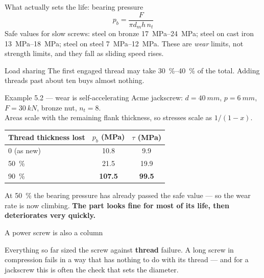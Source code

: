 \documentclass[aspectratio=169,10pt]{beamer}
\begin{document}
\begin{frame}{What actually sets the life: bearing pressure}
\[\boxed{\ p_b = \frac{F}{\pi d_m h\, n_t}\ }\]
\vfill
Safe values for slow screws: steel on bronze \SIrange{17}{24}{MPa}; steel on cast iron
\SIrange{13}{18}{MPa}; steel on steel \SIrange{7}{12}{MPa}.
\vfill
\alert{These are \emph{wear} limits, not strength limits}, and they fall as sliding speed rises.
\vfill
\begin{alertblock}{Load sharing}
The first engaged thread may take \SIrange{30}{40}{\percent} of the total. Adding threads past about
ten buys almost nothing.
\end{alertblock}
\end{frame}

\begin{frame}{Example 5.2 --- wear is self-accelerating}
Acme jackscrew: $d=\SI{40}{mm}$, $p=\SI{6}{mm}$, $F=\SI{30}{kN}$, bronze nut, $n_t=8$.\\
Areas scale with the remaining flank thickness, so stresses scale as $1/(1-x)$.
\vfill
\centering
\begin{tabular}{@{}lcc@{}}
\toprule
Thread thickness lost & $p_b$ (\si{MPa}) & $\tau$ (\si{MPa})\\
\midrule
0 (as new) & 10.8 & 9.9\\
\SI{50}{\percent} & 21.5 & 19.9\\
\SI{90}{\percent} & \alert{\textbf{107.5}} & \alert{\textbf{99.5}}\\
\bottomrule
\end{tabular}
\vfill
\raggedright
At \SI{50}{\percent} the bearing pressure has already passed the safe value --- so the wear rate is now
climbing.
\vfill
\centering\textbf{The part looks fine for most of its life, then deteriorates very quickly.}
\end{frame}


\begin{frame}{A power screw is also a column}
\centering
\resizebox{!}{4.4cm}{}
\vfill
\raggedright
Everything so far sized the screw against \textbf{thread} failure. A long screw in compression fails
in a way that has nothing to do with its thread --- and for a jackscrew this is often the check that
sets the diameter.
\end{frame}
\end{document}
